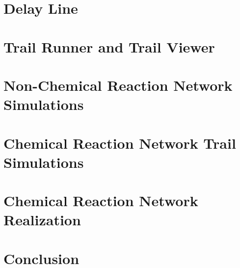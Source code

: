 \documentclass[12pt,oneside,letterpaper]{PSUreport}
\begin{document}
\glsresetall
\chapter{Delay Line}
\label{chap:delay_line}


\glsresetall
\chapter{Trail Runner and Trail Viewer}
\label{chap:trail_runner}


\glsresetall
\chapter{Non-Chemical Reaction Network Simulations}
\label{chap:non_crn_testing}


\glsresetall
\chapter{Chemical Reaction Network Trail Simulations}
\label{chap:trail_simulations}


\glsresetall
\chapter{Chemical Reaction Network Realization}
\label{chap:chem_real}


\glsresetall
\chapter{Conclusion}
\label{chap:conclusion}







\appendix

\end{document}
